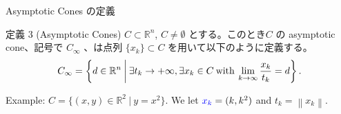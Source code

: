 \documentclass[aspectratio=169, dvipdfmx, 11pt]{beamer} %
\begin{document}
\begin{frame}{Asymptotic Cones の定義}
  \begin{block}{定義 3 (Asymptotic Cones) \cite{ref1}}
    $C \subset \mathbb{R}^n$, $C \ne \emptyset$ とする。このとき$C$ の asymptotic cone、記号で $C_\infty$ 、は点列 $\{ x_k \} \subset C$ を用いて以下のように定義する。
    \begin{equation}
    C_\infty = \left\{ d \in
    \mathbb{R}^n \:\middle|\: \exists t_k \rightarrow +\infty, \exists x_k \in C \:\text{with}\: \lim_{k \to \infty} \frac{x_k}{t_k} = d \right\}. \notag
    \end{equation}
  \end{block}

  \pause
  Example: $C = \{(x,y) \in \mathbb{R}^2 \:|\: y=x^2\}$. We let $\textcolor{blue}{x_k} = (k, k^2)$ and $t_k = \left\lVert x_k \right\rVert$.


\end{frame}
\end{document}
